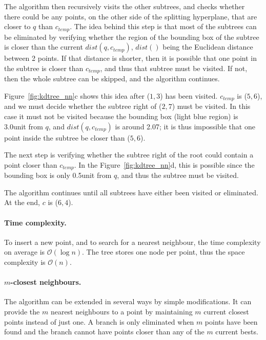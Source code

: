 The algorithm then recursively visits the other subtrees, and checks whether there could be any points, on the other side of the splitting hyperplane, that are closer to $q$ than $c_{temp}$.
The idea behind this step is that most of the subtrees can be eliminated by verifying whether the region of the bounding box of the subtree is closer than the current $dist(q, c_{temp})$, $dist()$ being the Euclidean distance between 2 points.
If that distance is shorter, then it is possible that one point in the subtree is closer than $c_{temp}$, and thus that subtree must be visited. 
If not, then the whole subtree can be skipped, and the algorithm continues.

Figure~\ref{fig:kdtree_nn}c shows this idea after ($1,3$) has been visited.
$c_{temp}$ is ($5,6$), and we must decide whether the subtree right of ($2,7$) must be visited.
In this case it must not be visited because the bounding box (light blue region) is 3.0unit from $q$, and $dist(q,c_{temp})$ is around 2.07; it is thus impossible that one point inside the subtree be closer than ($5,6$).

The next step is verifying whether the subtree right of the root could contain a point closer than $c_{temp}$.
In the Figure~\ref{fig:kdtree_nn}d, this is possible since the bounding box is only 0.5unit from $q$, and thus the subtree must be visited.

The algorithm continues until all subtrees have either been visited or eliminated.
At the end, $c$ is ($6,4$).


\paragraph{Time complexity.}
To insert a new point, and to search for a nearest neighbour, the time complexity on average is $\mathcal{O}(\log n)$.
The tree stores one node per point, thus the space complexity is $\mathcal{O}(n)$.

\paragraph{$m$-closest neighbours.}
The algorithm can be extended in several ways by simple modifications. 
It can provide the $m$ nearest neighbours to a point by maintaining $m$ current closest points instead of just one. 
A branch is only eliminated when $m$ points have been found and the branch cannot have points closer than any of the $m$ current bests. 



